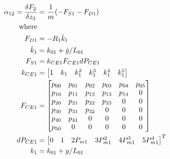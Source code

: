 \documentclass[11pt,a4paper]{article}
\begin{document}
\begin{appendices}
\begin{align}
    \alpha_{12} = \fdv{F_2}{z_3} &= \frac{1}{m}(-F_{S1} - F_{D1})
    \label{math:alpha_12_matrix}\\
    \text{where}\nonumber\\
    F_{D1} &= -R_1\dot{k}_1\nonumber\\
    \dot{k}_1 &= k_{01} + \dot{y}/L_{01}\nonumber\\
    F_{S1} &= k_{CE1} F_{CE1} dP_{CE1}\nonumber\\
    k_{CE1} &= 
    \begin{bmatrix}
        1 & k_1 & k_1^2 & k_1^3 & k_1^4 & k_1^5
    \end{bmatrix}\nonumber\\
    F_{CE1} &= 
    \begin{bmatrix}
             p_{00} & p_{01} & p_{02} & p_{03} & p_{04} & p_{05}\\
             p_{10} & p_{11} & p_{12} & p_{13} & p_{14} & 0\\
             p_{20} & p_{21} & p_{22} & p_{23} & 0      & 0\\
             p_{30} & p_{31} & p_{32} & 0      & 0      & 0\\
             p_{40} & p_{41} & 0      & 0      & 0      & 0\\
             p_{50} & 0      & 0      & 0      & 0      & 0
    \end{bmatrix}\nonumber\\
    dP_{CE1} &= 
    \begin{bmatrix}
        0 & 1 & 2P_{m1} & 3P_{m1}^2 & 4P_{m1}^3 & 5P_{m1}^4
    \end{bmatrix}^T\nonumber\\
    k_1 &= k_{01} + y/L_{01}\nonumber
\end{align}


\end{appendices}
\end{document}
